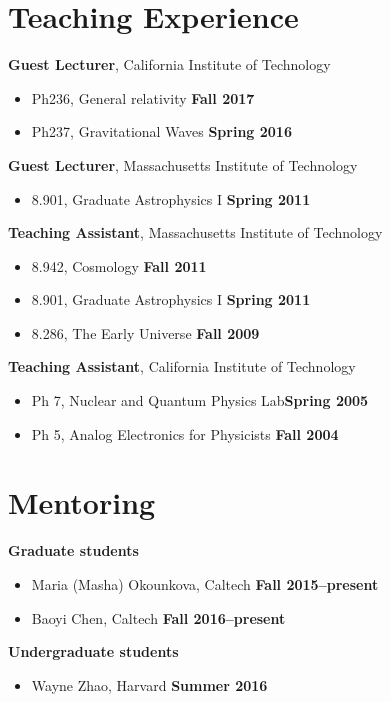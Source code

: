\documentclass[margin,line]{res}
\begin{document}
\begin{resume}
\section{\sc Teaching Experience}
{\bf Guest Lecturer}, California Institute of Technology
\vspace*{.05in}
\begin{itemize}
\item[ ] Ph236, General relativity \hfill {\bf Fall 2017}
\item[ ] Ph237, Gravitational Waves \hfill {\bf Spring 2016}
\end{itemize}
{\bf Guest Lecturer}, Massachusetts Institute of Technology
\vspace*{.05in}  
\begin{itemize}
\item[ ] 8.901, Graduate Astrophysics I \hfill {\bf Spring 2011}
\end{itemize}
{\bf Teaching Assistant}, Massachusetts Institute of Technology
\vspace*{.05in}
\begin{itemize}
\item[ ] 8.942, Cosmology \hfill {\bf Fall 2011}
\item[ ] 8.901, Graduate Astrophysics I \hfill {\bf Spring 2011}
\item[ ] 8.286, The Early Universe \hfill {\bf Fall 2009}
\end{itemize}
{\bf Teaching Assistant}, California Institute of Technology
\vspace*{.05in}
\begin{itemize}
\item[ ] Ph 7, Nuclear and Quantum Physics Lab\hfill {\bf Spring 2005}
\item[ ] Ph 5, Analog Electronics for Physicists \hfill {\bf Fall 2004}
\end{itemize}

\section{\sc Mentoring}
{\bf Graduate students}
\begin{itemize}
\item[] Maria (Masha) Okounkova, Caltech
\hfill {\bf Fall 2015--present}
\item[] Baoyi Chen, Caltech
\hfill {\bf Fall 2016--present}
\end{itemize}
{\bf Undergraduate students}
\begin{itemize}
\item[] Wayne Zhao, Harvard
\hfill {\bf Summer 2016}
\end{itemize}


\end{resume}
\end{document}
